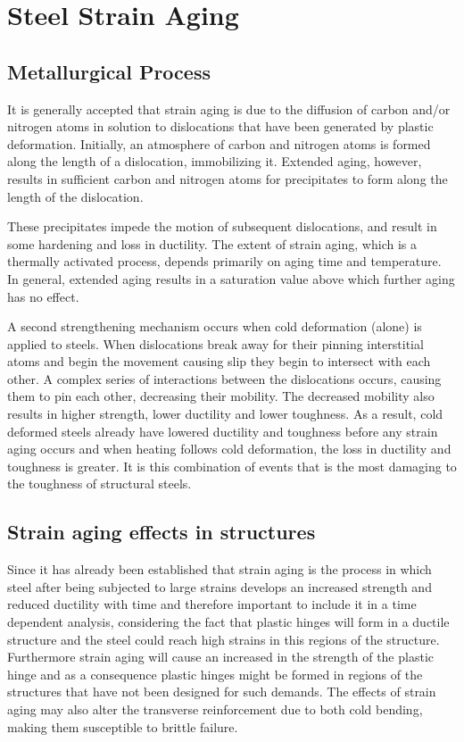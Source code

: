\section{Steel Strain Aging}

\subsection{Metallurgical Process}

It is generally accepted that strain aging is due to the diffusion of carbon and/or nitrogen atoms in solution to dislocations that have been generated by plastic deformation. Initially, an atmosphere of carbon and nitrogen atoms is formed along the length of a dislocation, immobilizing it. Extended aging, however, results in sufficient carbon and nitrogen atoms for precipitates to form along the length of the dislocation.

These precipitates impede the motion of subsequent dislocations, and result in some hardening and loss in ductility. The extent of strain aging, which is a thermally activated process, depends primarily on aging time and temperature. In general, extended aging results in a saturation value above which further aging has no effect.

A second strengthening mechanism occurs when cold deformation (alone) is applied to steels. When dislocations break away for their pinning interstitial atoms and begin the movement causing slip they begin to intersect with each other. A complex series of interactions between the dislocations occurs, causing them to pin each other, decreasing their mobility. The decreased mobility also results in higher strength, lower ductility and lower toughness. As a result, cold deformed steels already have lowered ductility and toughness before any strain aging occurs and when heating follows cold deformation, the loss in ductility and toughness is greater. It is this combination of events that is the most damaging to the toughness of structural steels.

\subsection{Strain aging effects in structures}

Since it has already been established that strain aging is the process in which steel after being subjected to large strains develops an increased strength and reduced ductility with time and therefore important to include it in a time dependent analysis, considering the fact that plastic hinges will form in a ductile structure and the steel could reach high strains in this regions of the structure. Furthermore strain aging will cause an increased in the strength of the plastic hinge and as a consequence plastic hinges might be formed in regions of the structures that have not been designed for such demands. The effects of strain aging may also alter the transverse reinforcement due to both cold bending, making them susceptible to brittle failure.

